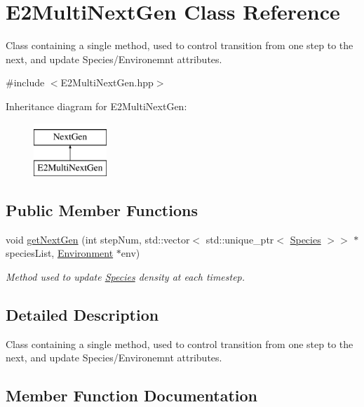 \hypertarget{classE2MultiNextGen}{}\section{E2\+Multi\+Next\+Gen Class Reference}
\label{classE2MultiNextGen}


Class containing a single method, used to control transition from one step to the next, and update Species/\+Environemnt attributes.  




{\ttfamily \#include $<$E2\+Multi\+Next\+Gen.\+hpp$>$}

Inheritance diagram for E2\+Multi\+Next\+Gen\+:\begin{figure}[H]
\begin{center}
\leavevmode
\includegraphics[height=2.000000cm]{classE2MultiNextGen}
\end{center}
\end{figure}
\subsection*{Public Member Functions}
\begin{DoxyCompactItemize}
\item 
void \hyperlink{classE2MultiNextGen_a22721fa0e9c2cbe1de3d0d6bb78932f0}{get\+Next\+Gen} (int step\+Num, std\+::vector$<$ std\+::unique\+\_\+ptr$<$ \hyperlink{classSpecies}{Species} $>$$>$ $\ast$species\+List, \hyperlink{classEnvironment}{Environment} $\ast$env)
\begin{DoxyCompactList}\small\item\em Method used to update \hyperlink{classSpecies}{Species} density at each timestep. \end{DoxyCompactList}\end{DoxyCompactItemize}


\subsection{Detailed Description}
Class containing a single method, used to control transition from one step to the next, and update Species/\+Environemnt attributes. 

\subsection{Member Function Documentation}
\hypertarget{classE2MultiNextGen_a22721fa0e9c2cbe1de3d0d6bb78932f0}{}\label{classE2MultiNextGen_a22721fa0e9c2cbe1de3d0d6bb78932f0} 
